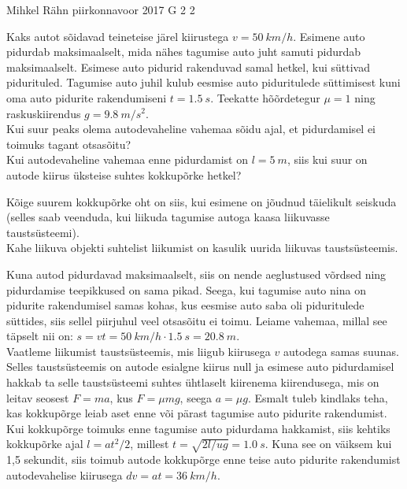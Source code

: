 {Mihkel Rähn} %
{piirkonnavoor} %
{2017} %
{G 2} %
{2} %
{
\ifStatement
Kaks autot sõidavad teineteise järel kiirustega $v=\SI{50}{km/h}$. Esimene auto pidurdab maksimaalselt, mida nähes tagumise auto juht samuti pidurdab maksimaalselt. Esimese auto pidurid rakenduvad samal hetkel, kui süttivad pidurituled. Tagumise auto juhil kulub eesmise auto piduritulede süttimisest kuni oma auto pidurite rakendumiseni $t=\SI{1,5}{s}$. Teekatte hõõrdetegur $\mu=1$ ning raskuskiirendus $g=\SI{9,8}{m/s^2}$.\\
\osa Kui suur peaks olema autodevaheline vahemaa sõidu ajal, et pidurdamisel ei toimuks tagant otsasõitu?\\
\osa Kui autodevaheline vahemaa enne pidurdamist on $l=\SI{5}{m}$, siis kui suur on autode kiirus üksteise suhtes kokkupõrke hetkel?
\fi


\ifHint
\osa Kõige suurem kokkupõrke oht on siis, kui esimene on jõudnud täielikult seiskuda (selles saab veenduda, kui liikuda tagumise autoga kaasa liikuvasse taustsüsteemi).\\
\osa Kahe liikuva objekti suhtelist liikumist on kasulik uurida liikuvas taustsüsteemis.
\fi


\ifSolution
\osa Kuna autod pidurdavad maksimaalselt, siis on nende aeglustused võrdsed ning pidurdamise teepikkused on sama pikad. Seega, kui tagumise auto nina on pidurite rakendumisel samas kohas, kus eesmise auto saba oli piduritulede süttides, siis sellel piirjuhul veel otsasõitu ei toimu. Leiame vahemaa, millal see täpselt nii on: $s=vt=\SI{50}{km/h}\cdot\SI{1,5}{s}=\SI{20,8}{m}$.\\
\osa Vaatleme liikumist taustsüsteemis, mis liigub kiirusega $v$ autodega samas suunas. Selles taustsüsteemis on autode esialgne kiirus null ja esimese auto pidurdamisel hakkab ta selle taustsüsteemi suhtes ühtlaselt kiirenema kiirendusega, mis on leitav seosest $F=ma$, kus $F=\mu mg$, seega $a=\mu g$. Esmalt tuleb kindlaks teha, kas kokkupõrge leiab aset enne või pärast tagumise auto pidurite rakendumist. Kui kokkupõrge toimuks enne tagumise auto pidurdama hakkamist, siis kehtiks kokkupõrke ajal $l=at^2/2$, millest $t=\sqrt{2l/ug}=\SI{1.0}{s}$. Kuna see on väiksem kui 1,5 sekundit, siis toimub autode kokkupõrge enne teise auto pidurite rakendumist autodevahelise kiirusega $dv=at=\SI{36}{km/h}$.
\fi


}
